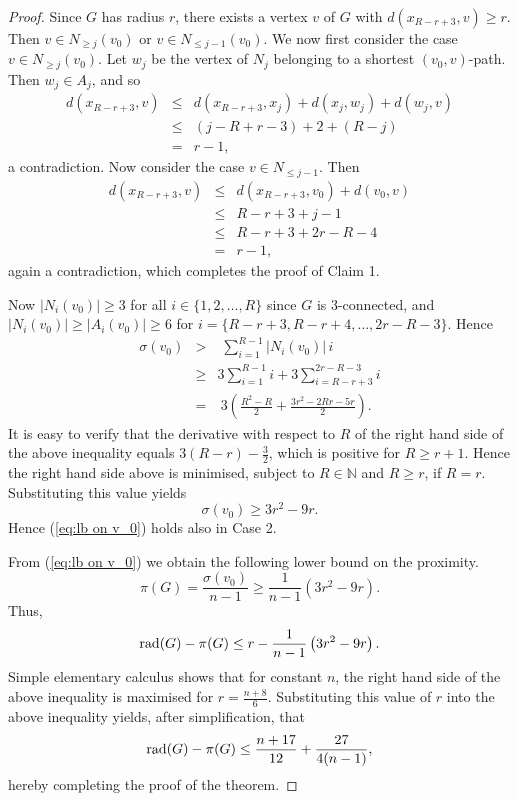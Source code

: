 \documentclass[a4paper,11pt]{article}
\begin{document}
\begin{proof}
Since $G$ has radius $r$, there exists a
vertex $v$ of $G$ with $d(x_{R-r+3},v) \geq r$. Then $v \in N_{\geq j}(v_0)$ or 
$v \in N_{\leq j-1}(v_0)$. We now first consider the case $v \in N_{\geq j}(v_0)$. Let $w_j$ be the vertex of $N_j$ belonging to a shortest $(v_0, v)$-path. Then  $w_j \in A_j$, and so 
\begin{eqnarray*}
d(x_{R-r+3},v) & \leq &  d(x_{R-r+3},x_j)+ d(x_j,w_j)+ d(w_j,v) \\
 & \leq &  (j-R+r-3)+2+(R-j) \\
  & = &  r-1,
\end{eqnarray*}
a contradiction. Now consider the case $v \in N_{\leq j-1} $. Then
\begin{eqnarray*}
d(x_{R-r+3},v) & \leq &  d(x_{R-r+3},v_0)+ d(v_0,v) \\
   & \leq &  R-r+3+j-1 \\
  & \leq &  R-r+3+2r-R-4 \\
   & = &  r-1,
\end{eqnarray*}
again a contradiction, which completes the proof of Claim 1. 

Now $|N_i(v_0)| \geq 3$ for all $i\in \{1,2,\ldots,R\}$ since $G$ is $3$-connected, 
and $|N_i(v_0)| \geq |A_i(v_0)| \geq 6$ for $i=\{R-r+3, R-r+4,\ldots,2r-R-3\}$. Hence  
\begin{eqnarray*} 
\sigma(v_0)  & > & \; \sum_{i=1}^{R-1}|N_i(v_0)| \, i \\
             & \geq & 3\sum_{i=1}^{R-1}i+ 3\sum_{i=R-r+3}^{2r-R-3}i \\
     & =&\ 3\left(\frac{R^2-R}{2}+\frac{3r^2-2Rr-5r}{2}\right). 
\end{eqnarray*}
It is easy to verify that the derivative with respect to $R$ of the right hand side of 
the above inequality equals $3(R-r) - \frac{3}{2}$, which is positive for $R \geq r+1$. 
Hence the right hand side above is minimised, subject to
$R \in \mathbb{N}$ and $R \geq r$, if $R=r$. Substituting 
this value yields
\[ \sigma(v_0) \geq 3r^2 - 9r. \]
Hence (\ref{eq:lb on v_0}) holds also in Case 2.

From (\ref{eq:lb on v_0}) we obtain the following lower bound on the proximity. 
\[\pi(G)= \frac{\sigma(v_0)}{n-1} \geq \frac{1}{n-1}\left(3r^2 - 9r\right).\]
Thus, 
\[{\rm rad}(G)-\pi(G) \leq r - \frac{1}{n-1}\left(3r^2 - 9r\right). \]
Simple elementary calculus shows that for constant $n$, the right hand side of the above inequality is maximised for $r=\frac{n+8}{6}$. Substituting this value of $r$ into the above inequality yields,
after simplification, that 
\[{\rm rad}(G)-\pi(G) \leq \frac{n+17}{12} + \frac{27}{4(n-1)}, \]
hereby completing the proof of the theorem.
\end{proof}
\end{document}
